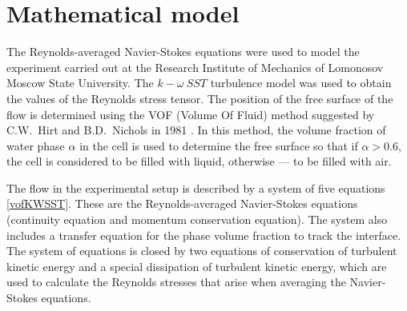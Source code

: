 \documentclass[mathematics,article,submit,pdftex,moreauthors]{Definitions/mdpi}
\begin{document}


\section{Mathematical model}\label{math_model}

The Reynolds-averaged Navier-Stokes equations \cite{Wilcox2006, Hirsch2007,FerzigerPeric2002} were used to model the experiment carried out at the Research Institute of Mechanics of Lomonosov Moscow State University. The $k-\omega\ SST$ turbulence model \cite{Menter1993, Menter1994} was used to obtain the values of the Reynolds stress tensor. The position of the free surface of the flow is determined using the VOF (Volume Of Fluid) method suggested by C.W.~Hirt and B.D.~Nichols in 1981 \cite{HirtNichols1981}. In this method, the volume fraction of water phase $\alpha$ in the cell is used to determine the free surface so that if $\alpha>0.6$, the cell is considered to be filled with liquid, otherwise --- to be filled with air.

The flow in the experimental setup is described by a system of five equations \eqref{vofKWSST}. These are the Reynolds-averaged Navier-Stokes equations (continuity equation and momentum conservation equation). The system also includes a transfer equation for the phase volume fraction to track the interface. The system of equations is closed by two equations of conservation of turbulent kinetic energy and a special dissipation of turbulent kinetic energy, which are used to calculate the Reynolds stresses that arise when averaging the Navier-Stokes equations.
\end{document}
